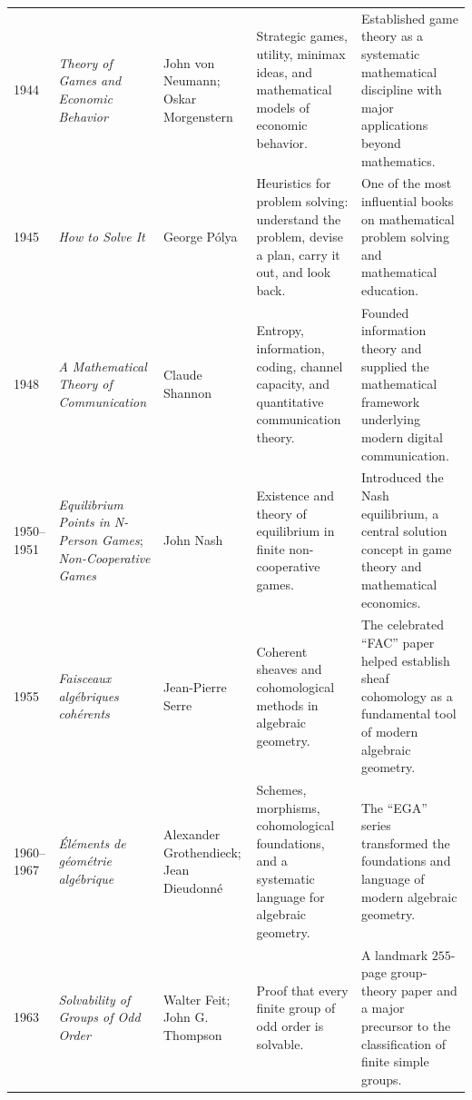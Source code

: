 {\begin{longtable}{@{}L{0.08\textwidth}L{0.21\textwidth}L{0.15\textwidth}L{0.22\textwidth}L{0.26\textwidth}@{}}
        1944
        & \textit{Theory of Games and Economic Behavior}
        & John von Neumann; Oskar Morgenstern
        & Strategic games, utility, minimax ideas, and mathematical models of economic behavior.
        & Established game theory as a systematic mathematical discipline with major applications beyond mathematics. \\

        1945
        & \textit{How to Solve It}
        & George P\'olya
        & Heuristics for problem solving: understand the problem, devise a plan, carry it out, and look back.
        & One of the most influential books on mathematical problem solving and mathematical education. \\

        1948
        & \textit{A Mathematical Theory of Communication}
        & Claude Shannon
        & Entropy, information, coding, channel capacity, and quantitative communication theory.
        & Founded information theory and supplied the mathematical framework underlying modern digital communication. \\

        1950--1951
        & \textit{Equilibrium Points in N-Person Games}; \textit{Non-Cooperative Games}
        & John Nash
        & Existence and theory of equilibrium in finite non-cooperative games.
        & Introduced the Nash equilibrium, a central solution concept in game theory and mathematical economics. \\

        1955
        & \textit{Faisceaux alg\'ebriques coh\'erents}
        & Jean-Pierre Serre
        & Coherent sheaves and cohomological methods in algebraic geometry.
        & The celebrated ``FAC'' paper helped establish sheaf cohomology as a fundamental tool of modern algebraic geometry. \\

        1960--1967
        & \textit{\'El\'ements de g\'eom\'etrie alg\'ebrique}
        & Alexander Grothendieck; Jean Dieudonn\'e
        & Schemes, morphisms, cohomological foundations, and a systematic language for algebraic geometry.
        & The ``EGA'' series transformed the foundations and language of modern algebraic geometry. \\

        1963
        & \textit{Solvability of Groups of Odd Order}
        & Walter Feit; John G. Thompson
        & Proof that every finite group of odd order is solvable.
        & A landmark $255$-page group-theory paper and a major precursor to the classification of finite simple groups. \\


\end{longtable}}
